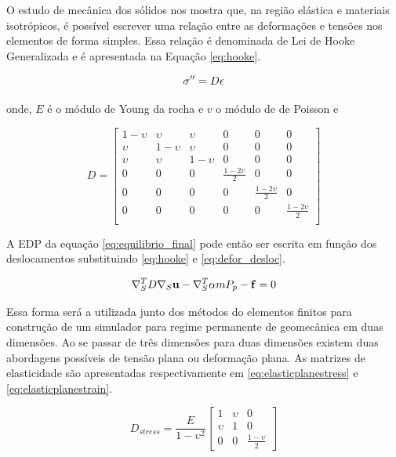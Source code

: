 O estudo de mecânica dos sólidos nos mostra que, na região elástica e materiais isotrópicos, é possível escrever uma relação entre as deformações e tensões nos elementos de forma simples. Essa relação é denominada de Lei de Hooke Generalizada e é apresentada na Equação \eqref{eq:hooke}.


\begin{equation}{
\label{eq:hooke}
\fontsize{4}{4}\selectfont
\sigma ^{\prime\prime}= D \epsilon
}
\end{equation}

onde, $E$ é o módulo de Young da rocha e $v$ o módulo de de Poisson e

\begin{equation}
    D = \begin{bmatrix}
 1-\upsilon & \upsilon    &  \upsilon & 0 & 0 & 0  \\
 \upsilon   &  1-\upsilon &  \upsilon & 0 & 0 & 0  \\
  \upsilon & \upsilon   &  1-\upsilon &  0 & 0 & 0 \\
 0& 0& 0 & \frac{1-2\upsilon}{2} & 0 & 0    \\
 0& 0& 0 & 0 &\frac{1-2\upsilon}{2} & 0     \\
 0& 0& 0 & 0 & 0 &  \frac{1-2\upsilon}{2}     \\
 
\end{bmatrix}
\end{equation}



A EDP da equação \eqref{eq:equilibrio_final} pode então ser escrita em função dos deslocamentos substituindo \eqref{eq:hooke} e \eqref{eq:defor_desloc}.

\begin{equation}
\label{eq:edp_geomec}
\nabla_S^TD \nabla_S \mathbf{u} - \nabla_S^T\alpha m P_p - \mathbf{f} = 0
\end{equation}

 Essa forma será a utilizada junto dos métodos do elementos finitos para construção de um simulador para regime permanente de geomecânica em duas dimensões. Ao se passar de três dimensões para duas dimensões existem duas abordagens possíveis de tensão plana ou deformação plana. As matrizes de elasticidade são apresentadas respectivamente em \eqref{eq:elasticplanestress} e \eqref{eq:elasticplanestrain}.

\begin{equation} \label{eq:elasticplanestress}
D_{stress} = \frac{E}{1-\upsilon^2}
\begin{bmatrix}
1  & \upsilon & 0 \\
\upsilon & 1 &  0 \\
0 & 0 & \frac{1-\upsilon}{2}
\end{bmatrix}
\end{equation}

